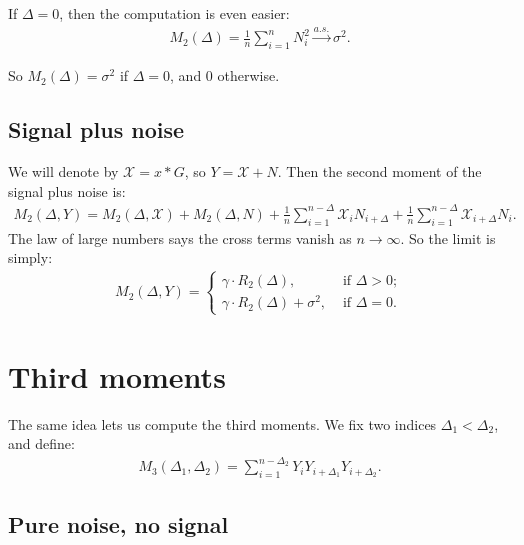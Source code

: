 \documentclass{article}
\theoremstyle{thm}
\theoremstyle{definition}
\newcommand{\XX}{\mathcal{X}}
\newcommand{\1}{\mathbf{1}}
\begin{document}
If $\Delta = 0$, then the computation is even easier:
%
\begin{align}
%
    M_2(\Delta) = \frac{1}{n} \sum_{i=1}^n N_i^2 
        \operatorname*{\longrightarrow}^{a.s.} \sigma^2.
%
\end{align}

So $M_2(\Delta) = \sigma^2$ if $\Delta = 0$, and 0 otherwise.



%
%
%

\subsection{Signal plus noise}

We will denote by $\XX = x \ast G$, so $Y = \XX + N$. Then the second moment of the signal plus noise is:
%
\begin{align}
%
    M_2(\Delta,Y) = M_2(\Delta,\XX) + M_2(\Delta,N) 
        + \frac{1}{n}\sum_{i=1}^{n-\Delta} \XX_i N_{i+\Delta}
        + \frac{1}{n}\sum_{i=1}^{n-\Delta} \XX_{i+\Delta} N_i.
%
\end{align}
%
The law of large numbers says the cross terms vanish as $n \to \infty$. So the limit is simply:
%
\begin{align}
%
    M_2(\Delta,Y) = 
    \begin{cases}
        \gamma \cdot R_2(\Delta), &\text{ if } \Delta > 0; \\
        \gamma \cdot R_2(\Delta) + \sigma^2, &\text{ if } \Delta = 0.
    \end{cases}
%
\end{align}

%
%
%

\section{Third moments}

The same idea lets us compute the third moments. We fix two indices $\Delta_1 < \Delta_2$, and define:
%
\begin{align}
%
    M_3(\Delta_1,\Delta_2) = \sum_{i=1}^{n-\Delta_2} Y_i Y_{i+\Delta_1} Y_{i+\Delta_2}.
%
\end{align}


%
%
%

\subsection{Pure noise, no signal}
\end{document}

